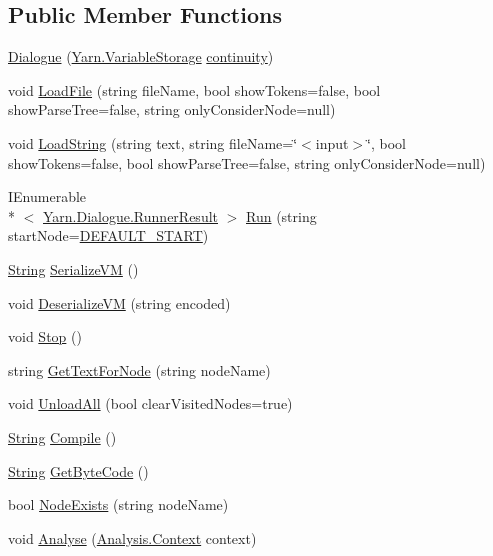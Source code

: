 \subsection*{Public Member Functions}
\begin{DoxyCompactItemize}
\item 
\hyperlink{a00050_a349debf4c4b8d48e3d80ff31ad380b0e}{Dialogue} (\hyperlink{a00102}{Yarn.\-Variable\-Storage} \hyperlink{a00050_ae94eaa4b03b432422f5d205fabe37ff5}{continuity})
\item 
void \hyperlink{a00050_af868f7f6928d122ca1d1857be433d92b}{Load\-File} (string file\-Name, bool show\-Tokens=false, bool show\-Parse\-Tree=false, string only\-Consider\-Node=null)
\item 
void \hyperlink{a00050_a7b66187877ec8a2bfee2298d3dd16706}{Load\-String} (string text, string file\-Name=\char`\"{}$<$input$>$\char`\"{}, bool show\-Tokens=false, bool show\-Parse\-Tree=false, string only\-Consider\-Node=null)
\item 
I\-Enumerable\\*
$<$ \hyperlink{a00083}{Yarn.\-Dialogue.\-Runner\-Result} $>$ \hyperlink{a00050_aead84ee50cb113ca45724894290ce9c2}{Run} (string start\-Node=\hyperlink{a00050_a1b643f15f734090e6a58cbf13dafd28f}{D\-E\-F\-A\-U\-L\-T\-\_\-\-S\-T\-A\-R\-T})
\item 
\hyperlink{a00040_a301aa7c866593a5b625a8fc158bbeacea27118326006d3829667a400ad23d5d98}{String} \hyperlink{a00050_aab20e7ce30fd9c2b3f19f7626be477a4}{Serialize\-V\-M} ()
\item 
void \hyperlink{a00050_aaa680fc471c1d78fd75ed3bde9b491e3}{Deserialize\-V\-M} (string encoded)
\item 
void \hyperlink{a00050_a7a6cabe5612fdcdc4619460431f85112}{Stop} ()
\item 
string \hyperlink{a00050_a594641914a2b59cc5231645273d18e82}{Get\-Text\-For\-Node} (string node\-Name)
\item 
void \hyperlink{a00050_a7acfe32f91b36ee812059f2ad3011133}{Unload\-All} (bool clear\-Visited\-Nodes=true)
\item 
\hyperlink{a00040_a301aa7c866593a5b625a8fc158bbeacea27118326006d3829667a400ad23d5d98}{String} \hyperlink{a00050_a7a8a3a461011172f5624da3a8ffa875f}{Compile} ()
\item 
\hyperlink{a00040_a301aa7c866593a5b625a8fc158bbeacea27118326006d3829667a400ad23d5d98}{String} \hyperlink{a00050_aade6c069db8f01572060d25a963d2a14}{Get\-Byte\-Code} ()
\item 
bool \hyperlink{a00050_a93bb76a1f9a4058f225ff4cee97483c6}{Node\-Exists} (string node\-Name)
\item 
void \hyperlink{a00050_a6b67b239f50c062160666e54592c433f}{Analyse} (\hyperlink{a00045}{Analysis.\-Context} context)
\end{DoxyCompactItemize}
